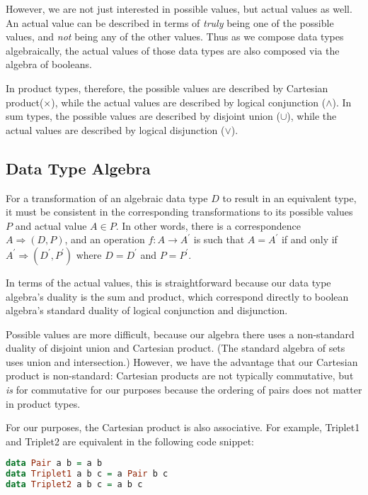 \documentclass[12pt,a4paper]{article}
\begin{document}
		However, we are not just interested in possible values, but actual values as well. An actual value can be described in terms of \textit{truly} being one of the possible values, and \textit{not} being any of the other values. Thus as we compose data types algebraically, the actual values of those data types are also composed via the algebra of booleans.
		
		In product types, therefore, the possible values are described by Cartesian product($\times$), while the actual values are described by logical conjunction ($\land$). In sum types, the possible values are described by disjoint union ($\cup$), while the actual values are described by logical disjunction ($\lor$).
		
		\subsection{Data Type Algebra}
		
		For a transformation of an algebraic data type $D$ to result in an equivalent type, it must be consistent in the corresponding transformations to its possible values $P$ and actual value $A \in P$. In other words, there is a correspondence $A \Rightarrow (D, P)$, and an operation $f: A \to A^\prime$ is such that $A = A^\prime$ if and only if $A^\prime \Rightarrow (D^\prime, P^\prime)$ where $D = D^\prime$ and $P = P^\prime$.
		
		In terms of the actual values, this is straightforward because our data type algebra's duality is the sum and product, which correspond directly to boolean algebra's standard duality of logical conjunction and disjunction.
		
		Possible values are more difficult, because our algebra there uses a non-standard duality of disjoint union and Cartesian product. (The standard algebra of sets uses union and intersection.) However, we have the advantage that our Cartesian product is non-standard: Cartesian products are not typically commutative, but \textit{is} for commutative for our purposes because the ordering of pairs does not matter in product types.
		
		For our purposes, the Cartesian product is also associative. For example, Triplet1 and Triplet2 are equivalent in the following code snippet:
		
		\begin{lstlisting}[language=Haskell]
data Pair a b = a b
data Triplet1 a b c = a Pair b c
data Triplet2 a b c = a b c
		\end{lstlisting}
	
\end{document}
